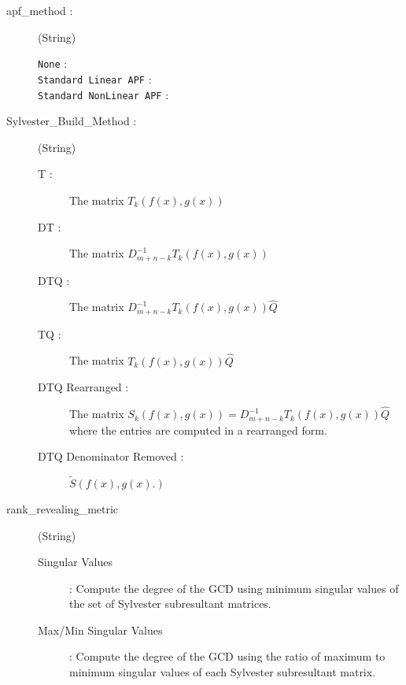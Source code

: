 \documentclass{article}
\begin{document}
\begin{description}
	
	
	\item[{apf\_method} : ] (String)
		\begin{description}
			\item[\texttt{None} : ] 
			\item[\texttt{Standard Linear APF} : ]
			\item[\texttt{Standard NonLinear APF} : ]
		\end{description}


	\item[{Sylvester\_Build\_Method : }] (String)
		\begin{description}
			
			\item[{T} : ]
			The matrix 
			$
				T_{k}
				\left(
					f(x)
					,
					g(x)
				\right)
			$
			
			
			\item[{DT} : ]
			The matrix 
			$
				D^{-1}_{m+n-k}
				T_{k}
				\left(
					f(x)
					,
					g(x)
				\right)
			$
			
			\item[{DTQ} : ]
			The matrix
			$
				D^{-1}_{m+n-k}
				T_{k}
				\left(
					f(x)
					,
					g(x)
				\right)
				\hat{Q}
			$
			
			
			\item[{TQ} : ]
			The matrix
			$
				T_{k}
				\left(
					f(x)
					,
					g(x)
				\right)
				\hat{Q}
			$
			
			\item[{DTQ Rearranged} : ]
			The matrix 
			$
				S_{k}
				\left(
					f(x)
					,
					g(x)
				\right)
				=
				D^{-1}_{m+n-k}
				T_{k}
				\left(
					f(x)
					,
					g(x)
				\right)
				\hat{Q}
			$ where the entries are computed in a rearranged form.
			
			\item[{DTQ Denominator Removed} : ]
			$
				\tilde{S}
				\left(
					f(x)
					,
					g(x).
				\right)
			$
			
		\end{description}


	\item [rank\_revealing\_metric] (String)
		\begin{description}
			\item[Singular Values] : Compute the degree of the GCD using minimum singular values of the set of Sylvester subresultant matrices.
			
			\item[Max/Min Singular Values] : Compute the degree of the GCD using the ratio of maximum to minimum singular values of each Sylvester subresultant matrix.
			

\end{description}
\end{description}
\end{document}
